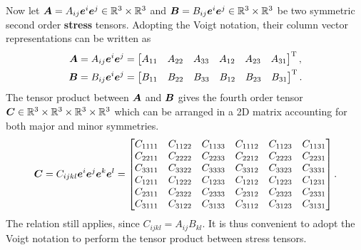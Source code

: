 Now let $\bm{A}=A_{ij}\bm{e}^i\bm{e}^j\in\mathbb{R}^3\times\mathbb{R}^3$ and $\bm{B}=B_{ij}\bm{e}^i\bm{e}^j\in\mathbb{R}^3\times\mathbb{R}^3$ be two symmetric second order \textbf{stress} tensors.
Adopting the Voigt notation, their column vector representations can be written as
\begin{gather}
\bm{A}=A_{ij}\bm{e}^i\bm{e}^j=\begin{bmatrix}
A_{11}&A_{22}&A_{33}&A_{12}&A_{23}&A_{31}
\end{bmatrix}^{\mathrm{T}},\\
\bm{B}=B_{ij}\bm{e}^i\bm{e}^j=\begin{bmatrix}
B_{11}&B_{22}&B_{33}&B_{12}&B_{23}&B_{31}
\end{bmatrix}^{\mathrm{T}}.
\end{gather}
The tensor product  between $\bm{A}$ and $\bm{B}$ gives the fourth order tensor $\bm{C}\in\mathbb{R}^3\times\mathbb{R}^3\times\mathbb{R}^3\times\mathbb{R}^3$ which can be arranged in a 2D matrix accounting for both major and minor symmetries.
\begin{gather}
\bm{C}=C_{ijkl}\bm{e}^i\bm{e}^j\bm{e}^k\bm{e}^l=\begin{bmatrix}
C_{1111}&C_{1122}&C_{1133}&C_{1112}&C_{1123}&C_{1131}\\
C_{2211}&C_{2222}&C_{2233}&C_{2212}&C_{2223}&C_{2231}\\
C_{3311}&C_{3322}&C_{3333}&C_{3312}&C_{3323}&C_{3331}\\
C_{1211}&C_{1222}&C_{1233}&C_{1212}&C_{1223}&C_{1231}\\
C_{2311}&C_{2322}&C_{2333}&C_{2312}&C_{2323}&C_{2331}\\
C_{3111}&C_{3122}&C_{3133}&C_{3112}&C_{3123}&C_{3131}
\end{bmatrix}.
\end{gather}
The relation  still applies, since $C_{ijkl}=A_{ij}B_{kl}$.
It is thus convenient to adopt the Voigt notation to perform the tensor product between stress tensors.

